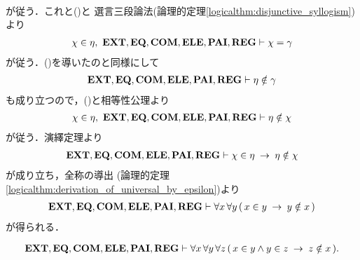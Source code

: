 \begin{sketch}
\begin{align}
		\end{align}
		が従う．これと()と
		選言三段論法(論理的定理\ref{logicalthm:disjunctive_syllogism})より
		\begin{align}
			\chi \in \eta,\ \mbox{{\bf EXT}},\mbox{{\bf EQ}},\mbox{\bf COM},\mbox{{\bf ELE}},\mbox{{\bf PAI}},\mbox{{\bf REG}} \vdash 
			\chi = \gamma
			\label{fom:no_pair_of_sets_go_round_9}
		\end{align}
		が従う．()を導いたのと同様にして
		\begin{align}
			\mbox{{\bf EXT}},\mbox{{\bf EQ}},\mbox{\bf COM},\mbox{{\bf ELE}},\mbox{{\bf PAI}},\mbox{{\bf REG}} \vdash \eta \notin \gamma
		\end{align}
		も成り立つので，()と相等性公理より
		\begin{align}
			\chi \in \eta,\ \mbox{{\bf EXT}},\mbox{{\bf EQ}},\mbox{\bf COM},\mbox{{\bf ELE}},\mbox{{\bf PAI}},\mbox{{\bf REG}} \vdash 
			\eta \notin \chi
		\end{align}
		が従う．演繹定理より
		\begin{align}
			\mbox{{\bf EXT}},\mbox{{\bf EQ}},\mbox{\bf COM},\mbox{{\bf ELE}},\mbox{{\bf PAI}},\mbox{{\bf REG}} \vdash 
			\chi \in \eta \hspace{0.25em}\rightarrow\hspace{0.25em} \eta \notin \chi
		\end{align}
		が成り立ち，全称の導出
		(論理的定理\ref{logicalthm:derivation_of_universal_by_epsilon})より
		\begin{align}
			\mbox{{\bf EXT}},\mbox{{\bf EQ}},\mbox{\bf COM},\mbox{{\bf ELE}},\mbox{{\bf PAI}},\mbox{{\bf REG}} \vdash 
			\forall x\, \forall y\, (\, x \in y \hspace{0.25em}\rightarrow\hspace{0.25em} y \notin x\, )
		\end{align}
		が得られる．
		\QED
	\end{sketch}
	
	\begin{screen}
		\begin{thm}[集合のどの三組も所属関係で堂々巡りしない]
		\label{thm:no_three_sets_go_round}
			\begin{align}
				\mbox{{\bf EXT}},\mbox{{\bf EQ}},\mbox{\bf COM},\mbox{{\bf ELE}},\mbox{{\bf PAI}},\mbox{{\bf REG}} \vdash 
				\forall x\, \forall y\, \forall z\, 
				(\, x \in y \wedge y \in z \hspace{0.25em}\rightarrow\hspace{0.25em} z \notin x\, ).
			\end{align}
		\end{thm}
	\end{screen}